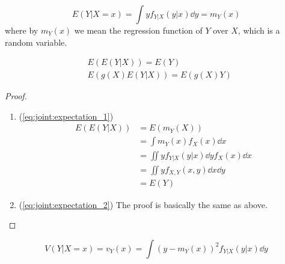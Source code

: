 \documentclass[12pt]{extarticle}
\begin{document}
\begin{definition}
    \begin{equation}
        E(Y|X = x) = \int y f_{Y | X}(y | x) \dd{y} = m_Y(x)
    \end{equation}
    where by $m_Y(x)$ we mean the regression function of $Y$ over $X$, which is a random variable.
\end{definition}

\begin{theorem}
    \label{thm:condition:prop_expectation}
    \begin{align}
         & E(E(Y|X)) = E(Y) \label{eq:joint:expectation_1}         \\
         & E(g(X)E(Y|X)) = E(g(X)Y) \label{eq:joint:expectation_2}
    \end{align}
\end{theorem}

\begin{proof}
    \skiplineafterproof
    \begin{enumerate}[label=\roman*.]
        \item (\autoref{eq:joint:expectation_1})
              \begin{align}
                  E(E(Y|X)) & = E(m_Y(X))                                 \\
                            & = \int m_Y(x) f_X(x) \dd{x}                 \\
                            & = \iint y f_{Y|X}(y|x) \dd{y} f_X(x) \dd{x} \\
                            & = \iint y f_{X, Y}(x, y) \dd{x} \dd{y}      \\
                            & = E(Y)
              \end{align}
        \item (\autoref{eq:joint:expectation_2}) The proof is basically the same as above.
    \end{enumerate}
\end{proof}

\begin{definition}
    \begin{equation}
        V(Y | X = x) = v_Y(x) = \int \left(y - m_Y(x) \right)^2 f_{Y|X}(y|x) \dd{y}
    \end{equation}
\end{definition}
\end{document}
